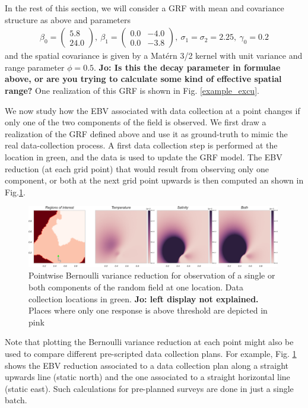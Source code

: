 \documentclass[aoas]{imsart}
\begin{document}
In the rest of this section, we will consider a GRF with mean and covariance structure as above and parameters
\begin{align*}
\beta_0 = \begin{pmatrix}
5.8\\ 24.0
\end{pmatrix}, ~ \beta_1 = \begin{pmatrix}
0.0 & -4.0\\
0.0 & -3.8
\end{pmatrix},~ \sigma_1 = \sigma_2 = 2.25, ~ \gamma_0 = 0.2
\end{align*}
and the spatial covariance is given by a Mat\'{e}rn 3/2 kernel with unit variance and range parameter $\phi=0.5$. {\bf{Jo: Is this the decay parameter in formulae above, or are you trying to calculate some kind of effective spatial range?}}
One realization of this GRF is shown in Fig. \ref{example_excu}.

We now study how the EBV associated with data collection at a point changes if only one of the two components of the field is observed. We first draw a realization of the GRF defined above and use it as ground-truth to mimic the real data-collection process. A first data collection step is performed at the location in green, and the data is used to update the GRF model. The EBV reduction (at each grid point) that would result from observing only one component, or both at the next grid point upwards is then computed an shown in Fig.\ref{fig:ebv_comp}.

\begin{figure}[h!] \centering
  \includegraphics[width=0.99\textwidth]{Figures/ebv_comp_2.png}
  \caption{Pointwise Bernoulli variance reduction for observation of a single or both components of the random field at one location. Data collection locations in green. {\bf{Jo: left display not explained.}} Places where only one response is above threshold are depicted in pink}
\label{fig:ebv_comp}
\end{figure}

Note that plotting the Bernoulli variance reduction at each point might also be used to compare different pre-scripted data collection plans. For example, Fig. \ref{fig:ebv_comp} shows the EBV reduction associated to a data collection plan along a straight upwards line (static north) and the one associated to a straight horizontal line (static east). Such calculations for pre-planned surveys are done in just a single batch.
\end{document}
